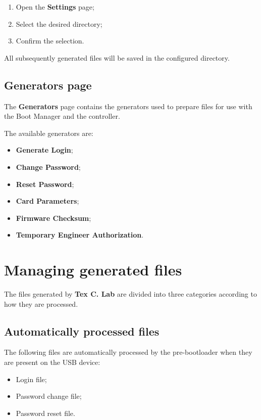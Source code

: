 ﻿\documentclass[11pt,a4paper]{article}
\newcommand{\software}{\textbf{Tex C. Lab}}
\newcommand{\button}[1]{\textbf{#1}}
\begin{document}
\begin{enumerate}
    \item Open the \button{Settings} page;
    \item Select the desired directory;
    \item Confirm the selection.
\end{enumerate}

All subsequently generated files will be saved in the configured
directory.

\subsection{Generators page}

The \textbf{Generators} page contains the generators used to prepare
files for use with the Boot Manager and the controller.

The available generators are:

\begin{itemize}
    \item \button{Generate Login};
    \item \button{Change Password};
    \item \button{Reset Password};
    \item \button{Card Parameters};
    \item \button{Firmware Checksum};
    \item \button{Temporary Engineer Authorization}.
\end{itemize}

\section{Managing generated files}

The files generated by \software{} are divided into three categories
according to how they are processed.

\subsection{Automatically processed files}

The following files are automatically processed by the pre-bootloader
when they are present on the USB device:

\begin{itemize}
    \item Login file;
    \item Password change file;
    \item Password reset file.
\end{itemize}
\end{document}
